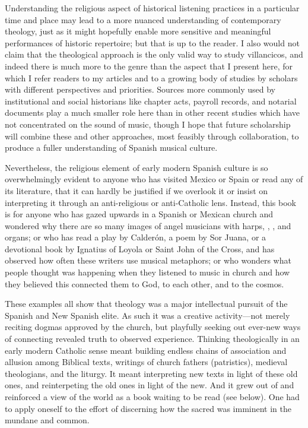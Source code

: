 Understanding the religious aspect of historical listening practices in a
particular time and place may lead to a more nuanced understanding of
contemporary theology, just as it might hopefully enable more sensitive and
meaningful performances of historic repertoire; but that is up to the reader.
I also would not claim that the theological approach is the only valid way to
study villancicos, and indeed there is much more to the genre than the aspect
that I present here, for which I refer readers to my articles and to a growing
body of studies by scholars with different perspectives and priorities.
Sources more commonly used by institutional and social historians like chapter
acts, payroll records, and notarial documents play a much smaller role here
than in other recent studies which have not concentrated on the sound
of music, though I hope that future scholarship will combine these and other
approaches, most feasibly through collaboration, to produce a fuller
understanding of Spanish musical culture.

Nevertheless, the religious element of early modern Spanish culture is so
overwhelmingly evident to anyone who has visited Mexico or Spain or read any of
its literature, that it can hardly be justified if we overlook it or insist on
interpreting it through an anti-religious or anti-Catholic lens.
Instead, this book is for anyone who has gazed upwards in a Spanish or Mexican
church and wondered why there are so many images of angel musicians with harps,
, , and organs; or who has read a play by
Calderón, a poem by Sor Juana, or a devotional book by Ignatius of Loyola or
Saint John of the Cross, and has observed how often these writers use musical
metaphors; or who wonders what people thought was happening when they listened
to music in church and how they believed this connected them to God, to each
other, and to the cosmos.

These examples all show that theology was a major intellectual pursuit of the
Spanish and New Spanish elite.
As such it was a creative activity---not merely reciting dogmas
approved by the church, but playfully seeking out ever-new ways of connecting
revealed truth to observed experience.
Thinking theologically in an early modern Catholic sense meant building 
endless chains of association and allusion among Biblical texts, writings of
church fathers (patristics), medieval theologians, and the liturgy. 
It meant interpreting new texts in light of these old ones, and reinterpeting
the old ones in light of the new.
And it grew out of and reinforced a view of the world as a book waiting to be
read (see below).
One had to apply oneself to the effort of discerning how the sacred was
imminent in the mundane and common.%

